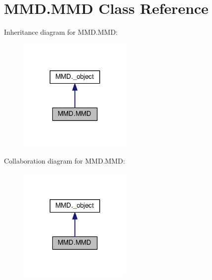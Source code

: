 \hypertarget{classMMD_1_1MMD}{}\section{M\+M\+D.\+M\+MD Class Reference}
\label{classMMD_1_1MMD}


Inheritance diagram for M\+M\+D.\+M\+MD\+:
\nopagebreak
\begin{figure}[H]
\begin{center}
\leavevmode
\includegraphics[width=155pt]{classMMD_1_1MMD__inherit__graph}
\end{center}
\end{figure}


Collaboration diagram for M\+M\+D.\+M\+MD\+:
\nopagebreak
\begin{figure}[H]
\begin{center}
\leavevmode
\includegraphics[width=155pt]{classMMD_1_1MMD__coll__graph}
\end{center}
\end{figure}
